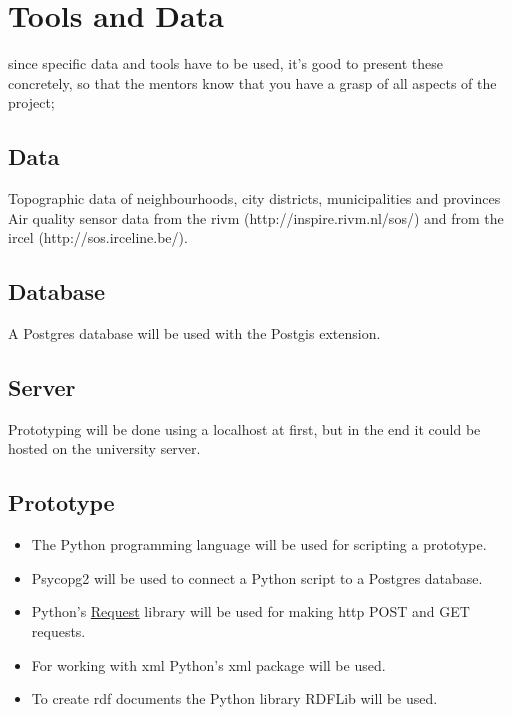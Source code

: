 \chapter{Tools and Data}
\label{chap:TD}

since specific data and tools have to be used, it’s good to present these concretely, so that the mentors know that you have a grasp of all aspects of the project;

\section{Data}
Topographic data of neighbourhoods, city districts, municipalities and provinces\\
Air quality sensor data from the \ac{rivm} (http://inspire.rivm.nl/sos/) and from the \ac{ircel} (http://sos.irceline.be/).

\section{Database}
A Postgres database will be used with the Postgis extension.

\section{Server}
Prototyping will be done using a localhost at first, but in the end it could be hosted on the university server.

\section{Prototype}
\begin{itemize}
	\item The Python programming language will be used for scripting a prototype. 
	\item Psycopg2 will be used to connect a Python script to a Postgres database.
	\item Python's \href{http://docs.python-requests.org/en/latest/user/quickstart/}{Request} library will be used for making \ac{http} POST and GET requests. 
	\item For working with \ac{xml} Python's xml package will be used.
	\item To create \ac{rdf} documents the Python library RDFLib will be used. 
\end{itemize}









  


